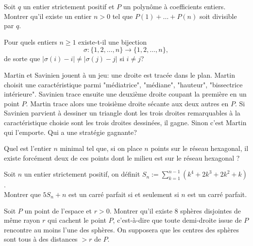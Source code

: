 \begin{exo}{}
Soit $q$ un entier strictement positif et $P$ un polynôme à coefficients entiers. Montrer qu'il existe un entier $n>0$ tel que $P(1)+\dots+P(n)$ soit divisible par $q$.\end{exo}

\begin{exo}{}
Pour quels entiers $n \geq 1$ existe-t-il une bijection
\[\sigma : \{ 1,2, \ldots,n\} \rightarrow \{ 1,2, \ldots,n\},\]
de sorte que $\vert \sigma(i)-i \vert \neq \vert \sigma(j)-j \vert$ si $i \neq j$?
\end{exo}

\begin{exo}{}
Martin et Savinien jouent à un jeu: une droite est tracée dans le plan. Martin choisit une caractéristique parmi "médiatrice", "médiane", "hauteur", "bissectrice intérieure". Savinien trace ensuite une deuxième droite coupant la première en un point $P$. Martin trace alors une troisième droite sécante aux deux autres en $P$. Si Savinien parvient à dessiner un triangle dont les trois droites remarquables à la caractéristique choisie sont les trois droites dessinées, il gagne. Sinon c'est Martin qui l'emporte. Qui a une stratégie gagnante?
\end{exo}


\begin{exo}{ }
Quel est l'entier $n$ minimal tel que, si on place $n$ points sur le
réseau hexagonal, il existe forcément deux de ces points dont le milieu est sur
le réseau hexagonal ?
\end{exo}

\begin{exo}{}
Soit $n$ un entier strictement positif, on définit $S_n:=\sum\limits_{k=1}^{n-1} (k^4+2k^3+2k^2+k)$.\\
 Montrer que $5S_n+n$ est un carré parfait si et seulement si $n$ est un carré parfait.  

\end{exo}

\begin{exo}{}
Soit $P$ un point de l'espace
et $r>0$. Montrer qu'il existe $8$ sphères disjointes de même rayon
$r$ qui cachent le point $P$, c'est-à-dire que toute demi-droite
issue de $P$ rencontre au moins l'une des sphères. On supposera que
les centres des sphères sont tous à des distances $>r$ de $P$.

\end{exo}

